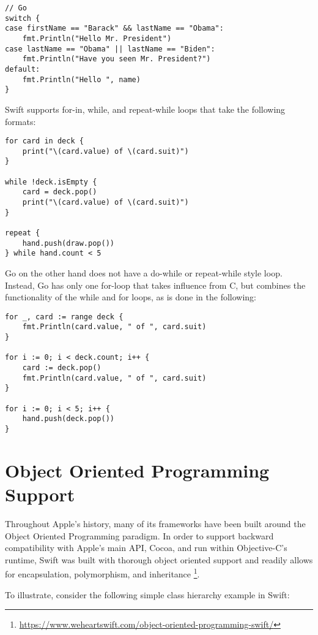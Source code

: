 \documentclass[letterpaper]{article}
\begin{document}
\begin{verbatim}
// Go
switch {
case firstName == "Barack" && lastName == "Obama":
    fmt.Println("Hello Mr. President")
case lastName == "Obama" || lastName == "Biden":
    fmt.Println("Have you seen Mr. President?")
default:
    fmt.Println("Hello ", name)
}
\end{verbatim}

Swift supports for-in, while, and repeat-while loops that take the following formats:

\begin{verbatim}
for card in deck {
    print("\(card.value) of \(card.suit)")
}

while !deck.isEmpty {
    card = deck.pop()
    print("\(card.value) of \(card.suit)")
}

repeat {
    hand.push(draw.pop())
} while hand.count < 5
\end{verbatim}

Go on the other hand does not have a do-while or repeat-while style loop. Instead, Go has only one for-loop that takes influence from C, but combines the functionality of the while and for loops, as is done in the following:

\begin{verbatim}
for _, card := range deck {
    fmt.Println(card.value, " of ", card.suit)
}

for i := 0; i < deck.count; i++ {
    card := deck.pop()
    fmt.Println(card.value, " of ", card.suit)
}

for i := 0; i < 5; i++ {
    hand.push(deck.pop())
}
\end{verbatim}

\section{Object Oriented Programming Support}

Throughout Apple’s history, many of its frameworks have been built around the Object Oriented Programming paradigm. In order to support backward compatibility with Apple’s main API, Cocoa, and run within Objective-C’s runtime, Swift was built with thorough object oriented support and readily allows for encapsulation, polymorphism, and inheritance \footnote{\url{https://www.weheartswift.com/object-oriented-programming-swift/}}.

To illustrate, consider the following simple class hierarchy example in Swift:
\end{document}
